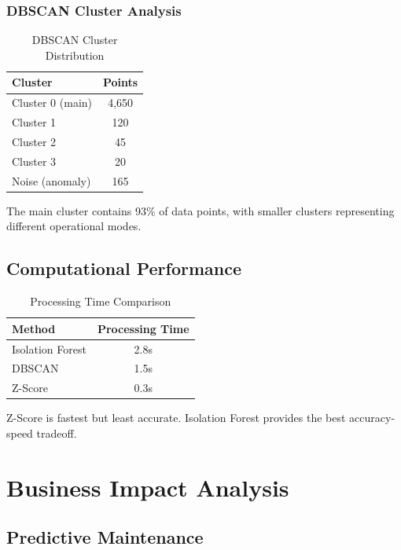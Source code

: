 \documentclass[12pt,a4paper]{report}
\begin{document}
\subsection{DBSCAN Cluster Analysis}

\begin{table}[H]
\centering
\caption{DBSCAN Cluster Distribution}
\begin{tabular}{lc}
\toprule
\textbf{Cluster} & \textbf{Points} \\
\midrule
Cluster 0 (main) & 4,650 \\
Cluster 1 & 120 \\
Cluster 2 & 45 \\
Cluster 3 & 20 \\
Noise (anomaly) & 165 \\
\bottomrule
\end{tabular}
\end{table}

The main cluster contains 93\% of data points, with smaller clusters representing different operational modes.

\section{Computational Performance}

\begin{table}[H]
\centering
\caption{Processing Time Comparison}
\begin{tabular}{lc}
\toprule
\textbf{Method} & \textbf{Processing Time} \\
\midrule
Isolation Forest & 2.8s \\
DBSCAN & 1.5s \\
Z-Score & 0.3s \\
\bottomrule
\end{tabular}
\end{table}

Z-Score is fastest but least accurate. Isolation Forest provides the best accuracy-speed tradeoff.

\chapter{Business Impact Analysis}
\label{ch:business_impact}

\section{Predictive Maintenance}
\end{document}
